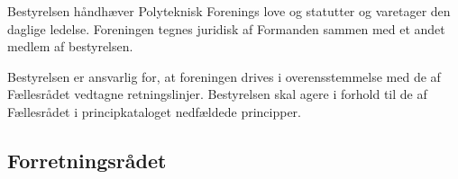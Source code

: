\begin{list}
\item Bestyrelsen håndhæver Polyteknisk Forenings love og statutter og varetager den daglige ledelse. Foreningen tegnes juridisk af Formanden sammen med et andet medlem af bestyrelsen.

\item Bestyrelsen er ansvarlig for, at foreningen drives i overensstemmelse med de af Fællesrådet vedtagne retningslinjer. Bestyrelsen skal agere i forhold til de af Fællesrådet i principkataloget nedfældede principper.




\subsection{Forretningsrådet}
\label{kapL:FRR}
%



\end{list}
